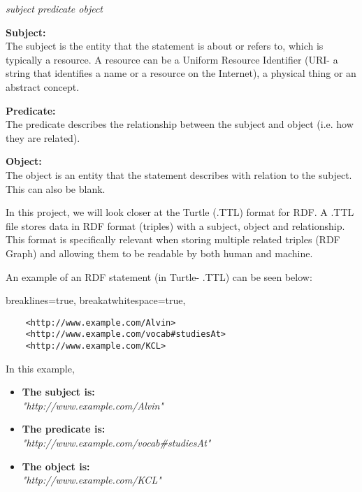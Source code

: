 \vspace{-0.1cm}
\begin{center}
\begin{beginquote}
   \textit{subject predicate object}
\end{beginquote} 
\end{center}
\vspace{-0.2cm}

\textbf{Subject:} \\
The subject is the entity that the statement is about or refers to, which is typically a resource. A resource can be a Uniform Resource Identifier (URI- a string that identifies a name or a resource on the Internet), a physical thing or an abstract concept. 

\textbf{Predicate:} \\
The predicate describes the relationship between the subject and object (i.e. how they are related). 

\textbf{Object:} \\
The object is an entity that the statement describes with relation to the subject. This can also be blank. 

In this project, we will look closer at the Turtle (.TTL) format for RDF. A .TTL file stores data in RDF format (triples) with a subject, object and relationship. This format is specifically relevant when storing multiple related triples (RDF Graph) and allowing them to be readable by both human and machine. \cite{TTL}

An example of an RDF statement (in Turtle- .TTL) can be seen below:

\vspace{-0.4cm}
\lstset
{
    breaklines=true,
    breakatwhitespace=true,
}
\begin{center}
\begin{lstlisting}
    <http://www.example.com/Alvin> 
    <http://www.example.com/vocab#studiesAt> 
    <http://www.example.com/KCL>
\end{lstlisting}
\end{center} 
\vspace{-0.3cm}

\noindent In this example, 
\vspace{-0.15cm}
\begin{itemize}
    \itemsep0em 
\item \textbf{The subject is:} \\ \textit{"http://www.example.com/Alvin"}
\item \textbf{The predicate is:} \\ \textit{"http://www.example.com/vocab\#studiesAt"}
\item \textbf{The object is:} \\ \textit{"http://www.example.com/KCL"}
\end{itemize}
\vspace{-0.1cm}

